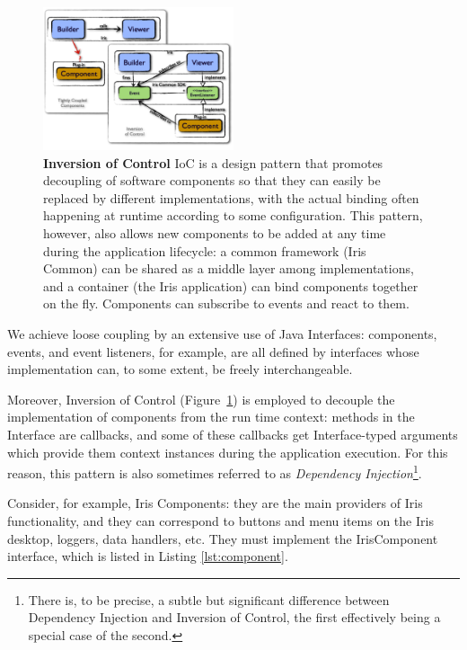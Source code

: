 \documentclass[5p]{elsarticle}
\begin{document}
\begin{figure}
\label{fig:ioc}
\begin{center}
\includegraphics[width=0.5\textwidth]{figures/IrisDiagrams.002.png}
\caption{\textbf{Inversion of Control} IoC is a design pattern that promotes decoupling of software components so that they can easily be replaced by different implementations, with the actual binding often happening at runtime according to some configuration. This pattern, however, also allows new components to be added at any time during the application lifecycle: a common framework (Iris Common) can be shared as a middle layer among implementations, and a container (the Iris application) can bind components together on the fly. Components can subscribe to events and react to them.}
\end{center}
\end{figure}

We achieve loose coupling by an extensive use of Java Interfaces: components, events, and event listeners, for example, are all defined by interfaces whose implementation can, to some extent, be freely interchangeable.

Moreover, Inversion of Control (Figure~\ref{fig:ioc}) is employed to decouple the implementation of components from the run time context: methods in the Interface are callbacks, and some of these callbacks get Interface-typed arguments which provide them context instances during the application execution. For this reason, this pattern is also sometimes referred to as \emph{Dependency Injection}\footnote{There is, to be precise, a subtle but significant difference between Dependency Injection and Inversion of Control, the first effectively being a special case of the second.}.

Consider, for example, Iris Components: they are the main providers of Iris functionality, and they can correspond to buttons and menu items on the Iris desktop, loggers, data handlers, etc. They must implement the IrisComponent interface, which is listed in Listing \ref{lst:component}.
\end{document}

